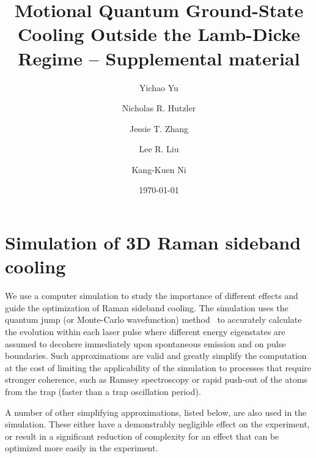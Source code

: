 \documentclass[aps,twocolumn,secnumarabic,amsmath,amssymb]{revtex4}
\begin{document}
\title{Motional Quantum Ground-State Cooling Outside the Lamb-Dicke Regime -- Supplemental material}
\author{Yichao Yu}
\author{Nicholas R. Hutzler}
\author{Jessie T. Zhang}
\author{Lee R. Liu}
\author{Kang-Kuen Ni}

\date{\today}

\maketitle

\section{Simulation of 3D Raman sideband cooling}

We use a computer simulation to study the importance of different effects
and guide the optimization of Raman sideband cooling.
The simulation uses the quantum jump (or Monte-Carlo wavefunction) method~\cite{Dalibard1992,Chretien2014}
to accurately calculate the evolution within each laser pulse where different energy eigenstates
are assumed to decohere immediately upon spontaneous emission and on pulse boundaries.
Such approximations are valid and greatly simplify the computation
at the cost of limiting the applicability of the simulation to processes that require stronger
coherence, such as Ramsey spectroscopy or rapid push-out of the atoms from the trap
(faster than a trap oscillation period).

A number of other simplifying approximations, listed below, are also used in the simulation.
These either have a demonstrably negligible effect on the experiment,
or result in a significant reduction of complexity for an effect
that can be optimized more easily in the experiment.
\end{document}
